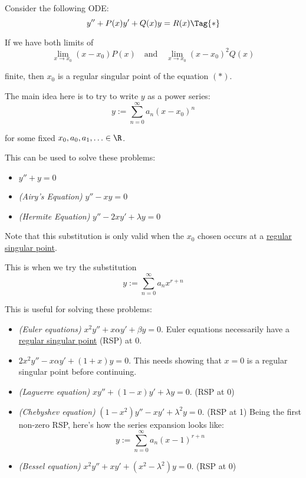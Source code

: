 Consider the following ODE:
\begin{equation*}
  y''+P(x)y'+Q(x)y=R(x)\Tag{*}
\end{equation*}

If we have both limits of
\begin{equation*}
  \lim_{x\to x_0}(x-x_0)P(x)\quad\text{and}\quad\lim_{x\to x_0}(x-x_0)^2Q(x)
\end{equation*}

finite, then $x_0$ is a regular singular point of the equation $(*)$.

\label{fdab69a}

The main idea here is to try to write $y$ as a power series:
$$
  y:=\sum_{n=0}^\infty a_n(x-x_0)^n
$$

for some fixed $x_0,a_0,a_1,\ldots\in\R$.

This can be used to solve these problems:
\begin{itemize}
  \item $y''+y=0$
  \item \textit{(Airy's Equation)} $y''-xy=0$
  \item \textit{(Hermite Equation)} $y''-2xy'+\lambda y=0$
\end{itemize}

Note that this substitution is only valid when the $x_0$ chosen occurs at a
\href{f490530}{regular singular point}.

\label{b1a3270}

This is when we try the substitution
$$
  y:=\sum_{n=0}^\infty a_nx^{r+n}
$$

This is useful for solving these problems:
\begin{itemize}
  \item \textit{(Euler equations)} $x^2y''+x\alpha y'+\beta y=0$. Euler
        equations necessarily have a \href{f490530}{regular singular point}
        (RSP) at $0$.
  \item $2x^2y''-x\alpha y'+(1+x)y=0$. This needs showing that $x=0$ is a
        regular singular point before continuing.
  \item \textit{(Laguerre equation)} $xy''+(1-x)y'+\lambda y=0$. (RSP at 0)
  \item \textit{(Chebyshev equation)} $(1-x^2)y''-xy'+\lambda^2y=0$. (RSP at 1)
        Being the first non-zero RSP, here's how the series expansion looks
        like:
        $$
          y:=\sum_{n=0}^\infty a_n(x-1)^{r+n}
        $$
  \item \textit{(Bessel equation)} $x^2y''+xy'+(x^2-\lambda^2)y=0$. (RSP at 0)
\end{itemize}

